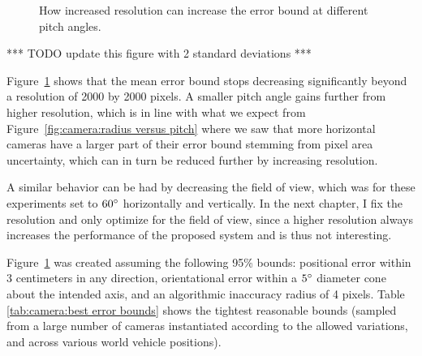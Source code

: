 \documentclass[a4paper,12pt,twoside,openright]{report}
\begin{document}
\begin{figure}[htb]
    \begin{center}
        
    \end{center}
    \caption[Resolution Limits]{How increased resolution can increase the error bound at different pitch angles.}
    \label{fig:camera:resolution}
\end{figure}

*** TODO update this figure with 2 standard deviations ***

Figure~\ref{fig:camera:resolution} shows that the mean error bound stops decreasing
significantly beyond a resolution of 2000 by 2000 pixels. A smaller pitch 
angle gains further from higher resolution, which is in line with what we 
expect from Figure~\ref{fig:camera:radius versus pitch} where we saw that more horizontal cameras
have a larger part of their error bound stemming from pixel area uncertainty,
which can in turn be reduced further by increasing resolution.

A similar behavior can be had by decreasing the field of view, which was for
these experiments set to $60\degree$ horizontally and vertically. 
In the next chapter, I fix the resolution and only optimize for the field of view,
since a higher resolution always increases the performance
of the proposed system and is thus not interesting.

Figure~\ref{fig:camera:resolution} was created assuming the following 95\% bounds: positional error
within 3 centimeters in any direction, orientational error within a
$5\degree$ diameter cone about the intended axis, 
and an algorithmic inaccuracy radius of 4 pixels. Table \ref{tab:camera:best error bounds}
shows the tightest reasonable bounds (sampled from
a large number of cameras instantiated according to the allowed variations,
and across various world vehicle positions). 

\end{document}
